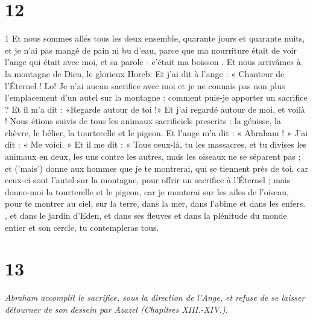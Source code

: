 \chapter{12}

\par 1 Et nous sommes allés tous les deux ensemble, quarante jours et quarante nuits, et je n'ai pas mangé de pain ni bu d'eau, parce que ma nourriture était de voir l'ange qui était avec moi, et sa parole - c'était ma boisson . Et nous arrivâmes à la montagne de Dieu, le glorieux Horeb. Et j'ai dit à l'ange : « Chanteur de l'Éternel ! Lo! Je n’ai aucun sacrifice avec moi et je ne connais pas non plus l’emplacement d’un autel sur la montagne : comment puis-je apporter un sacrifice ? Et il m'a dit : «Regarde autour de toi !» Et j'ai regardé autour de moi, et voilà ! Nous étions suivis de tous les animaux sacrificiels prescrits : la génisse, la chèvre, le bélier, la tourterelle et le pigeon. Et l’ange m’a dit : « Abraham ! » J'ai dit : « Me voici. » Et il me dit : « Tous ceux-là, tu les massacres, et tu divises les animaux en deux, les uns contre les autres, mais les oiseaux ne se séparent pas ; et ('mais') donne aux hommes que je te montrerai, qui se tiennent près de toi, car ceux-ci sont l'autel sur la montagne, pour offrir un sacrifice à l'Éternel ; mais donne-moi la tourterelle et le pigeon, car je monterai sur les ailes de l'oiseau, pour te montrer au ciel, sur la terre, dans la mer, dans l'abîme et dans les enfers. , et dans le jardin d'Eden, et dans ses fleuves et dans la plénitude du monde entier et son cercle, tu contempleras tous.

\chapter{13}

\par \textit{Abraham accomplit le sacrifice, sous la direction de l'Ange, et refuse de se laisser détourner de son dessein par Azazel (Chapitres XIII.-XIV.).}

